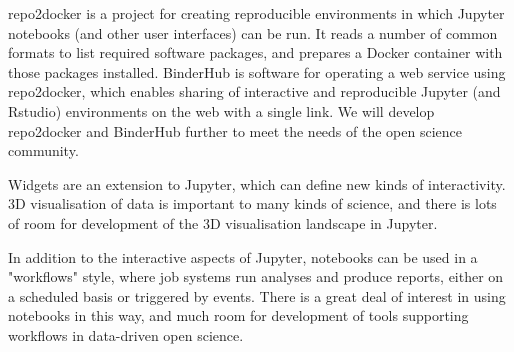 \begin{workpackage}
\begin{wpdescription}
repo2docker is a project for creating
reproducible environments in which Jupyter notebooks (and other user interfaces) can be run.
It reads a number of common formats to list required software packages,
and prepares a Docker container with those packages installed.
BinderHub is software for operating a web service using repo2docker,
which enables sharing of interactive and reproducible Jupyter (and Rstudio) environments on the web with a single link.
We will develop repo2docker and BinderHub further to meet the needs of the open science community.

Widgets are an extension to Jupyter, which can define new kinds of interactivity.
3D visualisation of data is important to many kinds of science,
and there is lots of room for development of the 3D visualisation landscape in Jupyter.

In addition to the interactive aspects of Jupyter,
notebooks can be used in a "workflows" style,
where job systems run analyses and produce reports,
either on a scheduled basis or triggered by events.
There is a great deal of interest in using notebooks in this way,
and much room for development of tools supporting workflows in data-driven open science.

\end{wpdescription}

\begin{tasklist}
% 





\end{tasklist}



\end{workpackage}
